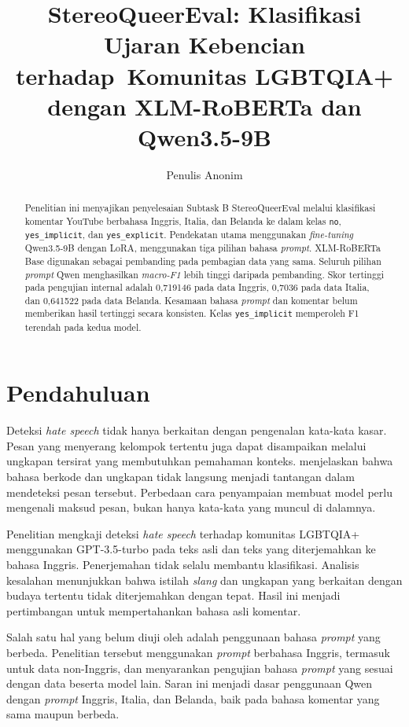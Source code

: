 \documentclass[11pt]{article}
\title{StereoQueerEval: Klasifikasi Ujaran Kebencian terhadap\
Komunitas LGBTQIA+ dengan XLM-RoBERTa dan Qwen3.5-9B}
\author{Penulis Anonim}
\begin{document}
\nolinenumbers
\raggedbottom
\maketitle
\begin{abstract}
Penelitian ini menyajikan penyelesaian Subtask B StereoQueerEval melalui klasifikasi komentar YouTube berbahasa Inggris, Italia, dan Belanda ke dalam kelas \texttt{no}, \texttt{yes\_implicit}, dan \texttt{yes\_explicit}. Pendekatan utama menggunakan \textit{fine-tuning} Qwen3.5-9B dengan LoRA, menggunakan tiga pilihan bahasa \textit{prompt}. XLM-RoBERTa Base digunakan sebagai pembanding pada pembagian data yang sama. Seluruh pilihan \textit{prompt} Qwen menghasilkan \textit{macro-F1} lebih tinggi daripada pembanding. Skor tertinggi pada pengujian internal adalah 0,719146 pada data Inggris, 0,7036 pada data Italia, dan 0,641522 pada data Belanda. Kesamaan bahasa \textit{prompt} dan komentar belum memberikan hasil tertinggi secara konsisten. Kelas \texttt{yes\_implicit} memperoleh F1 terendah pada kedua model.
\end{abstract}

\section{Pendahuluan}
Deteksi \textit{hate speech} tidak hanya berkaitan dengan pengenalan kata-kata kasar. Pesan yang menyerang kelompok tertentu juga dapat disampaikan melalui ungkapan tersirat yang membutuhkan pemahaman konteks. \citet{elsherief-etal-2021-latent} menjelaskan bahwa bahasa berkode dan ungkapan tidak langsung menjadi tantangan dalam mendeteksi pesan tersebut. Perbedaan cara penyampaian membuat model perlu mengenali maksud pesan, bukan hanya kata-kata yang muncul di dalamnya.

Penelitian \citet{chan-etal-2024-hate} mengkaji deteksi \textit{hate speech} terhadap komunitas LGBTQIA+ menggunakan GPT-3.5-turbo pada teks asli dan teks yang diterjemahkan ke bahasa Inggris. Penerjemahan tidak selalu membantu klasifikasi. Analisis kesalahan menunjukkan bahwa istilah \textit{slang} dan ungkapan yang berkaitan dengan budaya tertentu tidak diterjemahkan dengan tepat. Hasil ini menjadi pertimbangan untuk mempertahankan bahasa asli komentar.

Salah satu hal yang belum diuji oleh \citet{chan-etal-2024-hate} adalah penggunaan bahasa \textit{prompt} yang berbeda. Penelitian tersebut menggunakan \textit{prompt} berbahasa Inggris, termasuk untuk data non-Inggris, dan menyarankan pengujian bahasa \textit{prompt} yang sesuai dengan data beserta model lain. Saran ini menjadi dasar penggunaan Qwen dengan \textit{prompt} Inggris, Italia, dan Belanda, baik pada bahasa komentar yang sama maupun berbeda.
\end{document}
